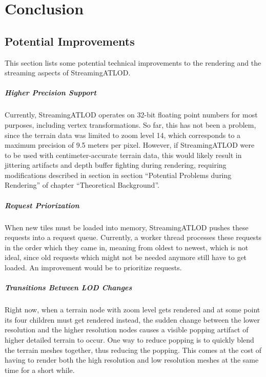 \chapter{Conclusion}

\section{Potential Improvements}
This section lists some potential technical improvements
to the rendering and the streaming aspects of StreamingATLOD.

\paragraph{Higher Precision Support}
Currently, StreamingATLOD operates on 32-bit floating point numbers 
for most purposes, including vertex transformations. 
So far, this has not been a problem, since 
the terrain data was limited to zoom level 14, which corresponds 
to a maximum precision of 9.5 meters per pixel. 
However, if StreamingATLOD were to be used with centimeter-accurate terrain data,
this would likely result in jittering artifacts 
and depth buffer fighting during rendering, requiring 
modifications described in section in section ``Potential Problems during Rendering'' of chapter ``Theoretical Background''.

\paragraph{Request Priorization}
When new tiles must be loaded into memory, StreamingATLOD pushes 
these requests into a request queue. Currently,
a worker thread processes these requests in the order 
which they came in, meaning from oldest to newest,
which is not ideal, since old requests which might not 
be needed anymore still have to get loaded.
An improvement would be to prioritize requests.

\paragraph{Transitions Between LOD Changes}
Right now, when a terrain node with zoom level 
gets rendered and at some point 
its four children must get rendered instead,
the sudden change between the lower resolution 
and the higher resolution nodes causes 
a visible popping artifact of higher detailed terrain 
to occur. One way to reduce popping 
is to quickly blend the terrain meshes
together, thus reducing the popping. 
This comes at the cost of having to render 
both the high resolution and low resolution 
meshes at the same time for a short while.

